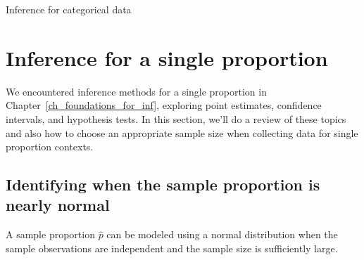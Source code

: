 \begin{chapterpage}{Inference for categorical data}
  \label{inferenceForCategoricalData}
  \label{ch_inference_for_props}
\end{chapterpage}
\renewcommand{\chapterfolder}{ch_inference_for_props}



\section{Inference for a single proportion}
\label{singleProportion}

We encountered inference methods for a single proportion
in Chapter~\ref{ch_foundations_for_inf},
exploring point estimates, confidence intervals,
and hypothesis tests.
In this section, we'll do a review of these topics
and also how to choose an appropriate sample size
when collecting data for single proportion contexts.


\subsection{Identifying when the sample proportion is nearly normal}

A sample proportion $\hat{p}$ can be modeled using
a normal distribution when the sample observations
are independent and the sample size is sufficiently
large.



